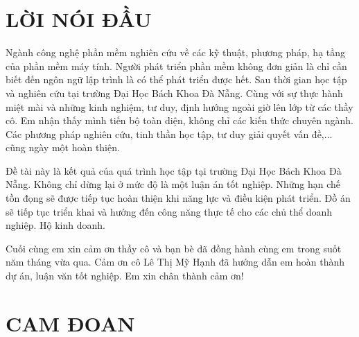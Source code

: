 \documentclass[11pt]{report}
\begin{document}
	\setcounter{page}{1}

	\clearpage
	\fontsize{13px}{13px}\selectfont\justifying
	\chapter*{LỜI NÓI ĐẦU}
	Ngành công nghệ phần mềm nghiên cứu về các kỹ thuật, phương pháp, hạ tầng của phần mềm máy tính. Người phát triển phần mềm không đơn giản là chỉ cần biết đến ngôn ngữ lập trình là có thể phát triển được hết. Sau thời gian học tập và nghiên cứu tại trường Đại Học Bách Khoa Đà Nẵng. Cùng với sự thực hành miệt mài và những kinh nghiệm, tư duy, định hướng ngoài giờ lên lớp từ các thầy cô. Em nhận thấy mình tiến bộ toàn diện, không chỉ các kiến thức chuyên ngành. Các phương pháp nghiên cứu, tinh thần học tập, tư duy giải quyết vấn đề,... cũng ngày một hoàn thiện.
	
	Đề tài này là kết quả của quá trình học tập tại trường Đại Học Bách Khoa Đà Nẵng. Không chỉ dừng lại ở mức độ là một luận án tốt nghiệp. Những hạn chế tồn đọng sẽ được tiếp tục hoàn thiện khi năng lực và điều kiện phát triển. Đồ án sẽ tiếp tục triển khai và hướng đến công năng thực tế cho các chủ thể doanh nghiệp. Hộ kinh doanh.
	
	Cuối cùng em xin cảm ơn thầy cô và bạn bè đã đồng hành cùng em trong suốt năm tháng vừa qua. Cảm ơn cô Lê Thị Mỹ Hạnh đã hướng dẫn em hoàn thành dự án, luận văn tốt nghiệp. Em xin chân thành cảm ơn!	
	\pagebreak
	
	\restoregeometry%
	\chapter*{CAM ĐOAN}
	\fontsize{13px}{13px}\selectfont\justifying
	
\end{document}

